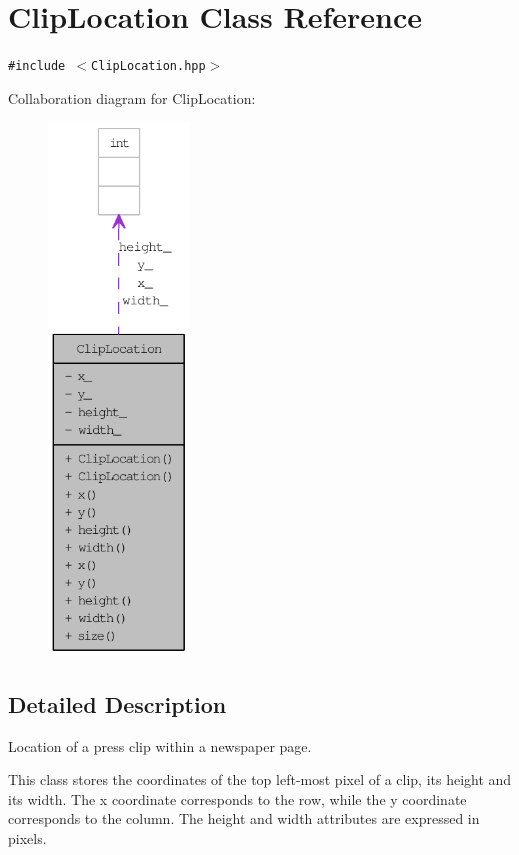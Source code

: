 \hypertarget{class_clip_location}{
\section{ClipLocation Class Reference}
\label{class_clip_location}
}
{\tt \#include $<$ClipLocation.hpp$>$}

Collaboration diagram for ClipLocation:\nopagebreak
\begin{figure}[H]
\begin{center}
\leavevmode
\includegraphics[height=400pt]{class_clip_location__coll__graph}
\end{center}
\end{figure}


\subsection{Detailed Description}
Location of a press clip within a newspaper page. 

This class stores the coordinates of the top left-most pixel of a clip, its height and its width. The x coordinate corresponds to the row, while the y coordinate corresponds to the column. The height and width attributes are expressed in pixels.

